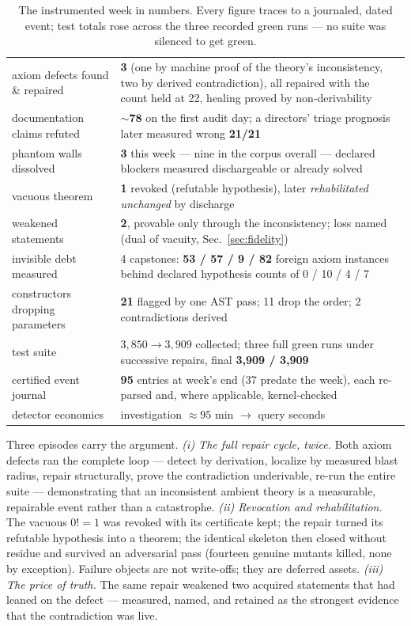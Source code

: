 \documentclass[11pt]{article}
\theoremstyle{remark}\newtheorem{example}{Example}
\begin{document}
\begin{table}[h]\centering\small
\begin{tabular}{lp{7.6cm}}
\toprule
axiom defects found \& repaired & \textbf{3} (one by machine proof of the theory's
inconsistency, two by derived contradiction), all repaired with the count held at 22,
healing proved by non-derivability \\
documentation claims refuted & ${\sim}\textbf{78}$ on the first audit day; a directors'
triage prognosis later measured wrong \textbf{21/21} \\
phantom walls dissolved & \textbf{3} this week --- nine in the corpus overall ---
declared blockers measured dischargeable or already solved \\
vacuous theorem & \textbf{1} revoked (refutable hypothesis), later
\emph{rehabilitated unchanged} by discharge \\
weakened statements & \textbf{2}, provable only through the inconsistency; loss named
(dual of vacuity, Sec.~\ref{sec:fidelity}) \\
invisible debt measured & 4 capstones: \textbf{53 / 57 / 9 / 82} foreign axiom
instances behind declared hypothesis counts of 0 / 10 / 4 / 7 \\
constructors dropping parameters & \textbf{21} flagged by one AST pass; 11 drop the
order; 2 contradictions derived \\
test suite & $3{,}850 \to 3{,}909$ collected; three full green runs under successive
repairs, final \textbf{3{,}909 / 3{,}909} \\
certified event journal & \textbf{95} entries at week's end (37 predate the week),
each re-parsed and, where applicable, kernel-checked \\
detector economics & investigation $\approx 95$ min $\to$ query seconds \\
\bottomrule
\end{tabular}
\caption{The instrumented week in numbers. Every figure traces to a journaled,
dated event; test totals rose across the three recorded green runs --- no suite was
silenced to get green.}
\end{table}

Three episodes carry the argument. \emph{(i) The full repair cycle, twice.} Both
axiom defects ran the complete loop --- detect by derivation, localize by measured
blast radius, repair structurally, prove the contradiction underivable, re-run the
entire suite --- demonstrating that an inconsistent ambient theory is a measurable,
repairable event rather than a catastrophe. \emph{(ii) Revocation and
rehabilitation.} The vacuous $0! = 1$ was revoked with its certificate kept; the
repair turned its refutable hypothesis into a theorem; the identical skeleton then
closed without residue and survived an adversarial pass (fourteen genuine mutants
killed, none by exception). Failure objects are not write-offs; they are deferred
assets. \emph{(iii) The price of truth.} The same repair weakened two acquired
statements that had leaned on the defect --- measured, named, and retained as the
strongest evidence that the contradiction was live.
\end{document}
